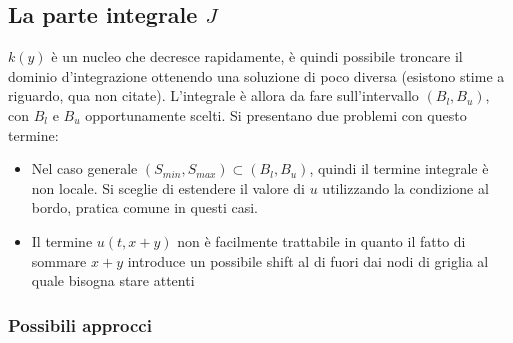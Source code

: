 \documentclass[a4paper,10pt]{article}
\begin{document}
\subsection{La parte integrale $J$}

$k(y)$ è un nucleo che decresce rapidamente, è quindi possibile troncare il dominio d'integrazione ottenendo una soluzione di poco diversa (esistono stime a riguardo, qua non citate). L'integrale è allora da fare sull'intervallo $(B_l,B_u)$, con $B_l$ e $B_u$ opportunamente scelti. Si presentano due problemi con questo termine:

\begin{itemize}
 \item Nel caso generale $(S_{min},S_{max}) \subset (B_l,B_u)$, quindi il termine integrale è non locale. Si sceglie di estendere il valore di $u$ utilizzando la condizione al bordo, pratica comune in questi casi.
 \item Il termine $u(t,x+y)$ non è facilmente trattabile in quanto il fatto di sommare $x+y$ introduce un possibile shift al di fuori dai nodi di griglia al quale bisogna stare attenti
\end{itemize}

\subsubsection{Possibili approcci}
\end{document}
